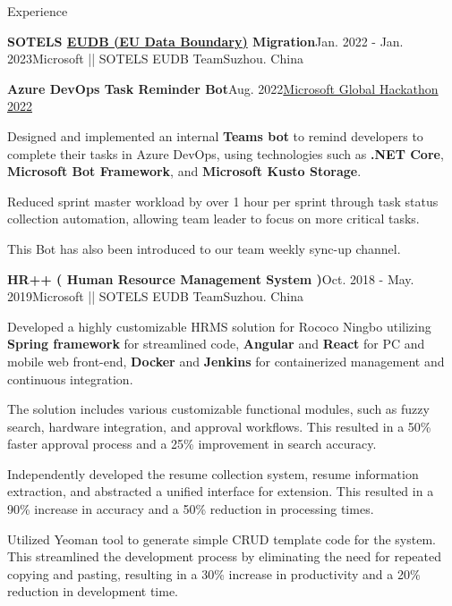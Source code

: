 \documentclass[a4paper]{resume} %
\begin{document}
\begin{rSection}{\large Experience}
\begin{rSubsection}{\textbf{\large{SOTELS {\href{https://www.microsoft.com/en-us/trust-center/privacy/european-data-boundary-eudb}{EUDB (EU Data Boundary)}} Migration}}}{Jan. 2022 - Jan. 2023}{Microsoft || SOTELS EUDB Team}{Suzhou. China}
\end{rSubsection}

\begin{rSubsection}{\textbf{\large{Azure DevOps Task Reminder Bot}}}{Aug. 2022}{\href{https://www.credly.com/badges/0a38f67f-44fb-4788-84ff-878430066bc8/linked_in_profile}{Microsoft Global Hackathon 2022}}

\item Designed and implemented an internal \textbf{Teams bot} to remind developers to complete their tasks in Azure DevOps, using technologies such as \textbf{.NET Core}, \textbf{Microsoft Bot Framework}, and \textbf{Microsoft Kusto Storage}.
\item Reduced sprint master workload by over 1 hour per sprint through task status collection automation, allowing team leader to focus on more critical tasks.
\item This Bot has also been introduced to our team weekly sync-up channel.

\end{rSubsection}

\begin{rSubsection}{\textbf{\large{HR++ ( Human Resource Management System )}}}{Oct. 2018 - May. 2019}{Microsoft || SOTELS EUDB Team}{Suzhou. China}

\item Developed a highly customizable HRMS solution for Rococo Ningbo utilizing \textbf{Spring framework} for streamlined code, \textbf{Angular} and \textbf{React} for PC and mobile web front-end, \textbf{Docker} and \textbf{Jenkins} for containerized management and continuous integration. 
\item The solution includes various customizable functional modules, such as fuzzy search, hardware integration, and approval workflows. This resulted in a 50\% faster approval process and a 25\% improvement in search accuracy.
\item Independently developed the resume collection system, resume information extraction, and abstracted a unified interface for extension. This resulted in a 90\% increase in accuracy and a 50\% reduction in processing times.
\item Utilized Yeoman tool to generate simple CRUD template code for the system. This streamlined the development process by eliminating the need for repeated copying and pasting, resulting in a 30\% increase in productivity and a 20\% reduction in development time.

\end{rSubsection}

\end{rSection}
\end{document}
